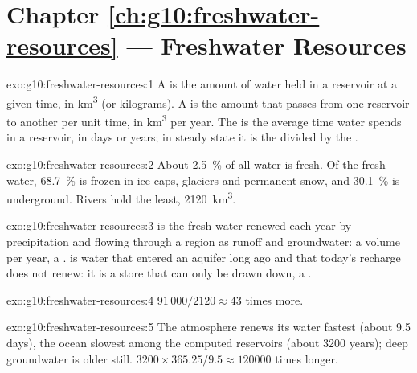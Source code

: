 \section*{Chapter \ref{ch:g10:freshwater-resources} --- Freshwater Resources}

\begin{solution}{exo:g10:freshwater-resources:1}
A  is the amount of water held in a reservoir at a given time, in
\unit{km^3} (or kilograms). A  is the amount that passes from one
reservoir to another per unit time, in \unit{km^3} per year. The  is the average time water spends in a reservoir, in days or years; in
steady state it is the  divided by the .
\end{solution}

\begin{solution}{exo:g10:freshwater-resources:2}
About \qty{2.5}{\percent} of all water is fresh. Of the fresh water,
\qty{68.7}{\percent} is frozen in ice caps, glaciers and permanent snow, and
\qty{30.1}{\percent} is underground. Rivers hold the least,
\num{2120}~\unit{km^3}.
\end{solution}

\begin{solution}{exo:g10:freshwater-resources:3}
 is the fresh water renewed each year by precipitation
and flowing through a region as runoff and groundwater: a volume per year,
a .  is water that entered an aquifer long ago and that
today's recharge does not renew: it is a store that can only be drawn down,
a .
\end{solution}

\begin{solution}{exo:g10:freshwater-resources:4}
$91\,000/2120 \approx 43$ times more.
\end{solution}

\begin{solution}{exo:g10:freshwater-resources:5}
The atmosphere renews its water fastest (about \num{9.5} days), the ocean
slowest among the computed reservoirs (about \num{3200} years); deep
groundwater is older still. $3200 \times 365.25/9.5 \approx \num{120000}$
times longer.
\end{solution}

